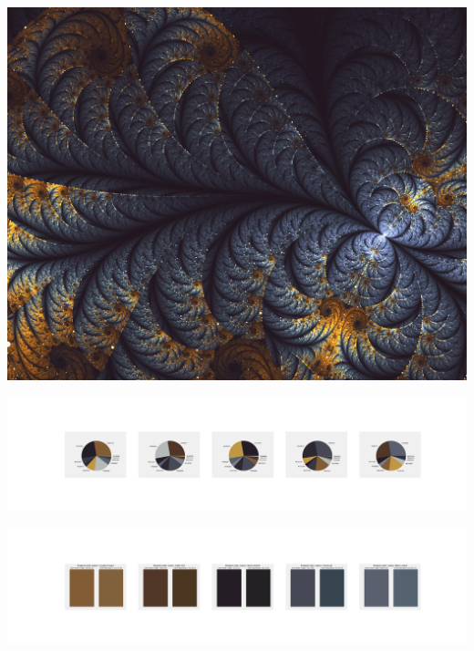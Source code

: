 \documentclass[11pt]{article}
\begin{document}
\begin{landscape}
    \begin{center}
    \includegraphics[width=\textwidth]{./nbimg/file (394).jpg}
    \end{center}

    \begin{center}
    \includegraphics[width=250mm]{./nbimg/pie-327.jpg}
    \end{center}

    \begin{center}
    \includegraphics[width=250mm]{./nbimg/peak-327.jpg}
    \end{center}
    


\end{landscape}
\end{document}
